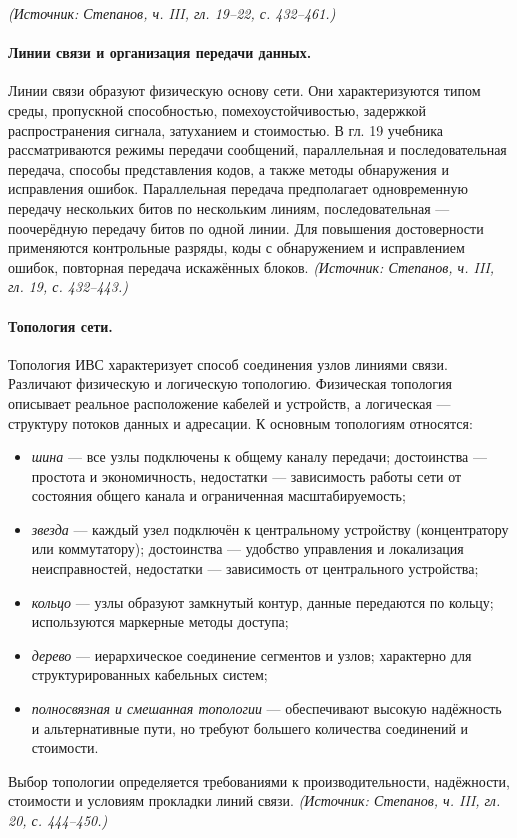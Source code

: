 \documentclass[a4paper,12pt]{article}
\begin{document}
\textit{(Источник: Степанов, ч. III, гл. 19–22, с. 432–461.)}

\paragraph{Линии связи и организация передачи данных.}
Линии связи образуют физическую основу сети. Они характеризуются типом среды, пропускной способностью, помехоустойчивостью, задержкой распространения сигнала, затуханием и стоимостью. В гл. 19 учебника рассматриваются режимы передачи сообщений, параллельная и последовательная передача, способы представления кодов, а также методы обнаружения и исправления ошибок. Параллельная передача предполагает одновременную передачу нескольких битов по нескольким линиям, последовательная — поочерёдную передачу битов по одной линии. Для повышения достоверности применяются контрольные разряды, коды с обнаружением и исправлением ошибок, повторная передача искажённых блоков.
\textit{(Источник: Степанов, ч. III, гл. 19, с. 432–443.)}

\paragraph{Топология сети.}
Топология ИВС характеризует способ соединения узлов линиями связи. Различают физическую и логическую топологию. Физическая топология описывает реальное расположение кабелей и устройств, а логическая — структуру потоков данных и адресации. К основным топологиям относятся:
\begin{itemize}
\item \emph{шина} — все узлы подключены к общему каналу передачи; достоинства — простота и экономичность, недостатки — зависимость работы сети от состояния общего канала и ограниченная масштабируемость;
\item \emph{звезда} — каждый узел подключён к центральному устройству (концентратору или коммутатору); достоинства — удобство управления и локализация неисправностей, недостатки — зависимость от центрального устройства;
\item \emph{кольцо} — узлы образуют замкнутый контур, данные передаются по кольцу; используются маркерные методы доступа;
\item \emph{дерево} — иерархическое соединение сегментов и узлов; характерно для структурированных кабельных систем;
\item \emph{полносвязная и смешанная топологии} — обеспечивают высокую надёжность и альтернативные пути, но требуют большего количества соединений и стоимости.
\end{itemize}
Выбор топологии определяется требованиями к производительности, надёжности, стоимости и условиям прокладки линий связи.
\textit{(Источник: Степанов, ч. III, гл. 20, с. 444–450.)}
\end{document}
